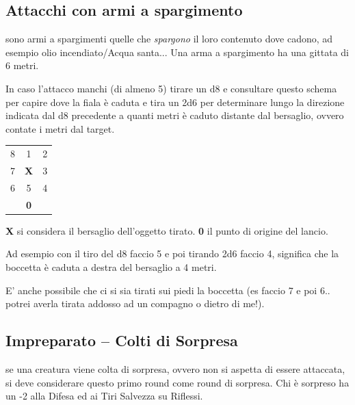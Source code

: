 \begin{multicols}{2}
\subsection{Attacchi con armi a spargimento} \label{attacchiarmidaspargimento}\hypertarget{spargimento}{}

sono armi a spargimenti quelle che \emph{spargono} il loro contenuto dove cadono, ad esempio olio incendiato/Acqua santa... Una arma a spargimento ha una gittata di 6 metri.

In caso l'attacco manchi (di almeno 5) tirare un d8 e consultare questo schema per capire dove la fiala è caduta e tira un 2d6 per determinare lungo la direzione indicata dal d8 precedente a quanti metri è caduto distante dal bersaglio, ovvero contate i metri dal target.

\medskip
\begin{center}

\begin{tabular}{ccc}
	8& 1& 2\\
	7 &\textbf{X}& 3\\
	6 &5 &4\\
	&\textbf{0}&
\end{tabular}
\end{center}

\smallskip

\textbf{X} si considera il bersaglio dell'oggetto tirato. \textbf{0} il punto di origine del lancio.

Ad esempio con il tiro del d8 faccio 5 e poi tirando 2d6 faccio 4, significa che la boccetta è caduta a destra del bersaglio a 4 metri.

E' anche possibile che ci si sia tirati sui piedi la boccetta (es faccio 7 e poi 6.. potrei averla tirata addosso ad un compagno o dietro di me!).

\subsection{Impreparato -- Colti di Sorpresa}\label{coltidisorpresa}\hypertarget{sorpresa}{}

se una creatura viene colta di sorpresa, ovvero non si aspetta di essere attaccata, si deve considerare questo primo round come round di sorpresa. Chi è sorpreso ha un -2 alla Difesa ed ai Tiri Salvezza su Riflessi.


\end{multicols}
